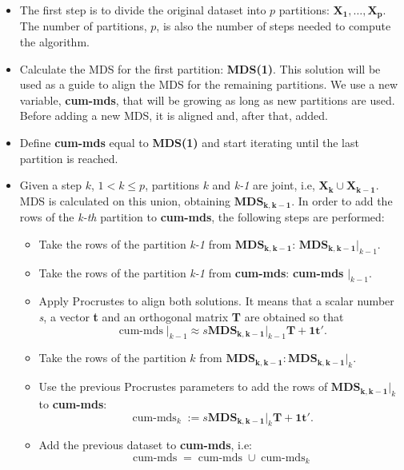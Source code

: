 \documentclass[11pt]{report}
\DeclareMathOperator{\cummds}{cum-mds}
\begin{document}
\begin{itemize}

\item The first step is to divide the original dataset into $p$ partitions: 
$\mathbf{X_1},\dots, \mathbf{X_p}$. The number of partitions, $p$, is also
the number of steps needed to compute the algorithm.

\item Calculate the MDS for the first partition: \textbf{MDS(1)}. This solution
will be used as a guide to align the MDS for the remaining partitions. We 
use a new variable, \textbf{cum-mds}, that will be growing as long as new 
partitions are used. Before adding a new MDS, it is aligned and, after 
that, added. 

\item Define \textbf{cum-mds} equal to \textbf{MDS(1)} and start iterating 
until the last partition is reached.

\item Given a step $k$, $1 < k \leq p$, partitions $k$ and \textit{k-1} are 
joint, i.e, $\mathbf{X_k} \cup \mathbf{X_{k-1}}$. MDS is calculated on 
this union, obtaining $\mathbf{MDS_{k, k-1}}$. In order to add the
rows of the \textit{k-th} partition to \textbf{cum-mds}, the following steps 
are performed:

\begin{itemize}
\item Take the rows of the partition \textit{k-1} from $\mathbf{MDS_{k, k-1}}$: 
$\mathbf{MDS_{k, k-1}} \Bigr|_{k-1}$.
\item Take the rows of the partition \textit{k-1} from \textbf{cum-mds}: 
\textbf{cum-mds} $\Bigr|_{k-1}$.
\item Apply Procrustes to align both solutions. It means that a scalar number
\textit{s}, a vector \textbf{t} and an orthogonal matrix \textbf{T} are obtained
so that
\[
\boldsymbol{\cummds} \Bigr|_{k-1} \approx s \mathbf{MDS_{k, k-1}} \Bigr|_{k-1} \mathbf{T} + \mathbf{1t}'.
\]
\item Take the rows of the partition $k$ from $\mathbf{MDS_{k, k-1}}: \mathbf{MDS_{k, k-1}} \Bigr|_{k}$.
\item Use the previous Procrustes parameters to add the rows of 
$\mathbf{MDS_{k, k-1}} \Bigr|_{k}$ to \textbf{cum-mds}:
\[
\boldsymbol{\cummds}_k := s \mathbf{\mathbf{MDS_{k, k-1}}} \Bigr|_{k} \mathbf{T} + \mathbf{1t}'.
\]
\item Add the previous dataset to \textbf{cum-mds}, i.e:
\[
\boldsymbol{\cummds} = \boldsymbol{\cummds} \cup \boldsymbol{{\cummds}}_k
\]

\end{itemize}
\end{itemize}
\end{document}
